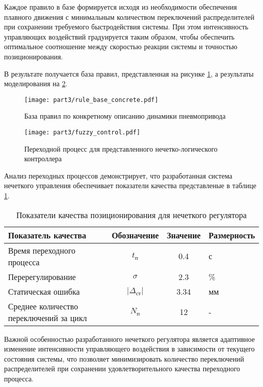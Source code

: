Каждое правило в базе формируется исходя из необходимости
обеспечения плавного движения с минимальным количеством
переключений распределителей при сохранении требуемого
быстродействия системы. При этом интенсивность управляющих
воздействий градуируется таким образом, чтобы обеспечить
оптимальное соотношение между скоростью реакции системы и
точностью позиционирования.

В результате получается база правил, представленная на рисунке \ref{fig:concrette_fuzzy_rules}, а результаты моделирования на \ref{fig:fuzzy_transient}.

\begin{figure}[ht]
	\centering
	\texttt{[image: part3/rule\_base\_concrete.pdf]}
	\caption{База правил по конкретному описанию динамики пневмопривода}
	\label{fig:concrette_fuzzy_rules}
\end{figure}

\begin{figure}[ht]
	\centering
	\texttt{[image: part3/fuzzy\_control.pdf]}
	\caption{Переходной процесс для представленного нечетко-логического контроллера }
	\label{fig:fuzzy_transient}
\end{figure}

Анализ переходных процессов демонстрирует, что разработанная система нечеткого управления обеспечивает показатели качества
представленые в таблице \ref{tab:fuzzy_quality}.

\begin{table}[h!]
	\centering
	\caption{Показатели качества позиционирования для нечеткого регулятора}
	\small
	\begin{tabular}{lccl}
		\textbf{Показатель качества}            & \textbf{Обозначение}   & \textbf{Значение} & \textbf{Размерность} \\
		\midrule
		Время переходного процесса              & $t_\text{п}$                  & \num{0.4}         & с                    \\
		Перерегулирование                       & $\sigma$               & \num{2.3}         & \%                   \\
		Статическая ошибка                      & $|\Delta_{\text{ст}}|$ & \num{3.34}        & мм                   \\
		Среднее количество переключений за цикл & $N_\text{п}$           & 12                & -                    \\
		\midrule
	\end{tabular}
	\label{tab:fuzzy_quality}
\end{table}


Важной особенностью разработанного нечеткого регулятора является адаптивное изменение интенсивности управляющего
воздействия в зависимости от текущего состояния системы, что позволяет минимизировать количество переключений распределителей при
сохранении удовлетворительного качества переходного процесса.
